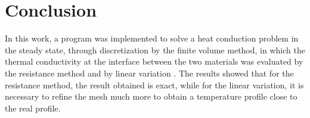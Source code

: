 \section{Conclusion}

In this work, a program was implemented to solve a heat conduction problem in the steady state, through discretization by the finite volume method, in which the thermal conductivity at the interface between the two materials was evaluated by the resistance method and by linear variation .
The results showed that for the resistance method, the result obtained is exact, while for the linear variation, it is necessary to refine the mesh much more to obtain a temperature profile close to the real profile.
